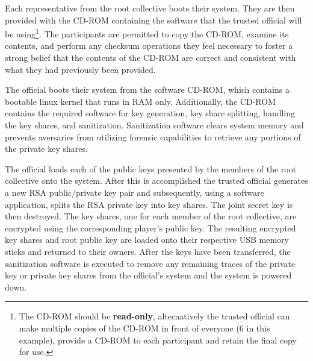 Each representative from the root collective boots their system. They
are then provided with the CD-ROM containing the software that the
trusted official will be using\footnote{The CD-ROM should be {\bf
read-only}, alternatively the trusted official can make multiple
copies of the CD-ROM in front of everyone (6 in this example), provide
a CD-ROM to each participant and retain the final copy for use.}. The
participants are permitted to copy the CD-ROM, examine its contents,
and perform any checksum operations they feel necessary to foster a
strong belief that the contents of the CD-ROM are correct and
consistent with what they had previously been provided.

The official boots their system from the software CD-ROM, which
contains a bootable linux kernel that runs in RAM only.  Additionally,
the CD-ROM contains the required software for key generation, key
share splitting, handling the key shares, and
sanitization. Sanitization software clears system memory and prevents
aversaries from utilizing forensic capabilities to retrieve any
portions of the private key shares.

The official loads each of the public keys presented by the members of
the root collective onto the system.  After this is accomplished the
trusted official generates a new RSA public/private key pair and
subsequently, using a software application, splits the RSA private key
into key shares. The joint secret key is then destroyed. The key
shares, one for each member of the root collective, are encrypted
using the corresponding player's public key. The resulting encrypted
key shares and root public key are loaded onto their respective USB
memory sticks and returned to their owners. After the keys have been
transferred, the sanitization software is executed to remove any
remaining traces of the private key or private key shares from the
official's system and the system is powered down.


